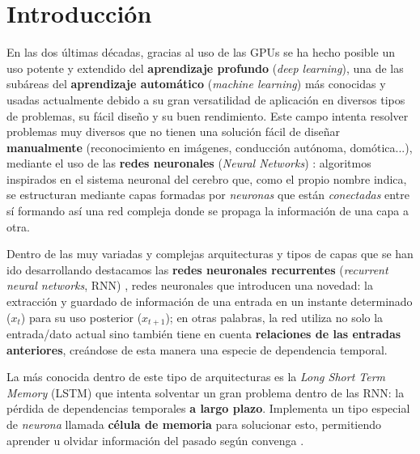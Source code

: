 %


\chapter{Introducción}\label{ch:introduccion}

En las dos últimas décadas, gracias al uso de las GPUs \cite{oh2004gpu} se ha hecho posible un uso potente y extendido del \textbf{aprendizaje profundo} (\textit{deep learning}), una de las subáreas del \textbf{aprendizaje automático} (\emph{machine learning}) más conocidas y usadas actualmente debido a su gran versatilidad de aplicación en diversos tipos de problemas, su fácil diseño y su buen rendimiento. Este campo intenta resolver problemas muy diversos que no tienen una solución fácil de diseñar \textbf{manualmente} (reconocimiento en imágenes, conducción autónoma, domótica...), mediante el uso de las \textbf{redes neuronales} (\emph{Neural Networks}) \cite{landahl1943statistical, hebb1949organization}: algoritmos inspirados en el sistema neuronal del cerebro que, como el propio nombre indica, se estructuran mediante capas formadas por \emph{neuronas} que están \emph{conectadas} entre sí formando así una red compleja donde se propaga la información de una capa a otra.

Dentro de las muy variadas y complejas arquitecturas y tipos de capas que se han ido desarrollando destacamos las \textbf{redes neuronales recurrentes} (\emph{recurrent neural networks}, RNN) \cite{hopfield1982neural, jordan1997serial}, redes neuronales que introducen una novedad: la extracción y guardado de información de una entrada en un instante determinado ($x_t$) para su uso posterior ($x_{t+1}$); en otras palabras, la red utiliza no solo la entrada/dato actual sino también tiene en cuenta \textbf{relaciones de las entradas anteriores}, creándose de esta manera una especie de dependencia temporal.

La más conocida dentro de este tipo de arquitecturas es la \emph{Long Short Term Memory} (LSTM) \cite{hochreiter1997long} que intenta solventar un gran problema dentro de las RNN: la pérdida de dependencias temporales \textbf{a largo plazo}. Implementa un tipo especial de \emph{neurona} llamada \textbf{célula de memoria} para solucionar esto, permitiendo aprender u olvidar información del pasado según convenga \cite{wang2017origin}.

